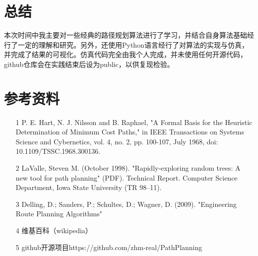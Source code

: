 \documentclass[12pt]{article}
\begin{document}
    \section{总结}
    本次时间中我主要对一些经典的路径规划算法进行了学习，并结合自身算法基础经行了一定的理解和研究。另外，还使用Python语言经行了对算法的实现与仿真，并完成了结果的可视化。仿真代码完全由我个人完成，并未使用任何开源代码，github仓库会在实践结束后设为public，以供复现检验。

    \section{参考资料}
    \begin{enumerate}
        \item[1] P. E. Hart, N. J. Nilsson and B. Raphael, "A Formal Basis for the Heuristic Determination of Minimum Cost Paths," in IEEE Transactions on Systems Science and Cybernetics, vol. 4, no. 2, pp. 100-107, July 1968, doi: 10.1109/TSSC.1968.300136.
        \item[2] LaValle, Steven M. (October 1998). "Rapidly-exploring random trees: A new tool for path planning" (PDF). Technical Report. Computer Science Department, Iowa State University (TR 98–11).
        \item[3] Delling, D.; Sanders, P.; Schultes, D.; Wagner, D. (2009). "Engineering Route Planning Algorithms"
        \item[4] 维基百科（wikipedia）  
        \item[5] github开源项目https://github.com/zhm-real/PathPlanning 
    \end{enumerate}
\end{document}
